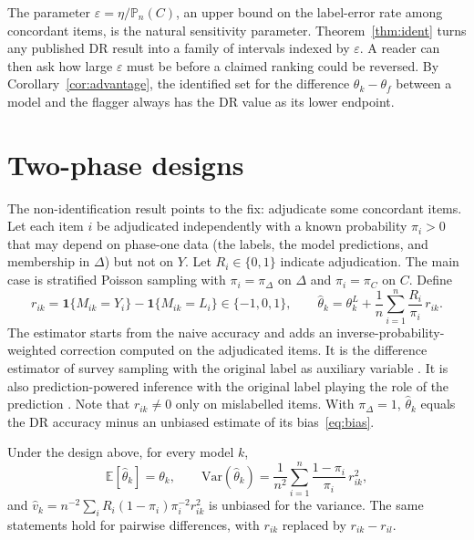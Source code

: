 \documentclass[twoside,11pt]{article}
\newcommand{\Pn}{\mathbb{P}_n}
\newcommand{\E}{\mathbb{E}}
\newcommand{\1}{\mathbf{1}}
\newcommand{\Dset}{\Delta}
\newcommand{\Cset}{C}
\begin{document}
The parameter $\varepsilon=\eta/\Pn(\Cset)$, an upper bound on the label-error rate among concordant items, is the natural sensitivity parameter. Theorem~\ref{thm:ident} turns any published DR result into a family of intervals indexed by $\varepsilon$. A reader can then ask how large $\varepsilon$ must be before a claimed ranking could be reversed. By Corollary~\ref{cor:advantage}, the identified set for the difference $\theta_k-\theta_f$ between a model and the flagger always has the DR value as its lower endpoint.

\section{Two-phase designs}
\label{sec:twophase}

The non-identification result points to the fix: adjudicate some concordant items. Let each item $i$ be adjudicated independently with a known probability $\pi_i>0$ that may depend on phase-one data (the labels, the model predictions, and membership in $\Dset$) but not on $Y$. Let $R_i\in\{0,1\}$ indicate adjudication. The main case is stratified Poisson sampling with $\pi_i=\pi_\Dset$ on $\Dset$ and $\pi_i=\pi_C$ on $\Cset$. Define
\[
r_{ik}=\1\{M_{ik}=Y_i\}-\1\{M_{ik}=L_i\}\in\{-1,0,1\},
\qquad
\hat\theta_k=\theta^L_k+\frac1n\sum_{i=1}^n\frac{R_i}{\pi_i}\,r_{ik}.
\]
The estimator starts from the naive accuracy and adds an inverse-probability-weighted correction computed on the adjudicated items. It is the difference estimator of survey sampling with the original label as auxiliary variable \citep{sarndal1992model}. It is also prediction-powered inference with the original label playing the role of the prediction \citep{angelopoulos2023prediction}. Note that $r_{ik}\neq0$ only on mislabelled items. With $\pi_\Dset=1$, $\hat\theta_k$ equals the DR accuracy minus an unbiased estimate of its bias~\eqref{eq:bias}.

\begin{theorem}\label{thm:unbiased}
Under the design above, for every model $k$,
\[
\E[\hat\theta_k]=\theta_k,\qquad
\mathrm{Var}(\hat\theta_k)=\frac1{n^2}\sum_{i=1}^n\frac{1-\pi_i}{\pi_i}\,r_{ik}^2,
\]
and $\hat v_k=n^{-2}\sum_i R_i(1-\pi_i)\pi_i^{-2}r_{ik}^2$ is unbiased for the variance. The same statements hold for pairwise differences, with $r_{ik}$ replaced by $r_{ik}-r_{il}$.
\end{theorem}
\end{document}
